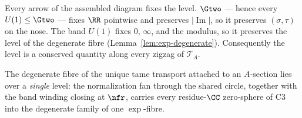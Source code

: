\begin{lemma}\label{lem:level-invariance}
Every arrow of the assembled diagram fixes the level. $\Gtwo$ --- hence every
$U(1) \le \Gtwo$ --- fixes $\RR$ pointwise and preserves $|\operatorname{Im}|$,
so it preserves $(\sigma, \tau)$ on the nose. The band $U(1)$ fixes $0$,
$\infty$, and the modulus, so it preserves the level of the degenerate fibre
\textup{(}Lemma~\ref{lem:exp-degenerate}\textup{)}. Consequently the level is
a conserved quantity along every zigzag of $\mathcal T_A$.
\end{lemma}

\begin{proposition}\label{prop:placement-gc}
The degenerate fibre of the unique tame transport attached to an $A$-section
lies over a \emph{single} level: the normalization fan through the shared
circle, together with the band winding closing at $\nfr$, carries every
residue-$\CC$ zero-sphere of \textup{C3} into the degenerate family of one
$\exp$-fibre.
\end{proposition}

